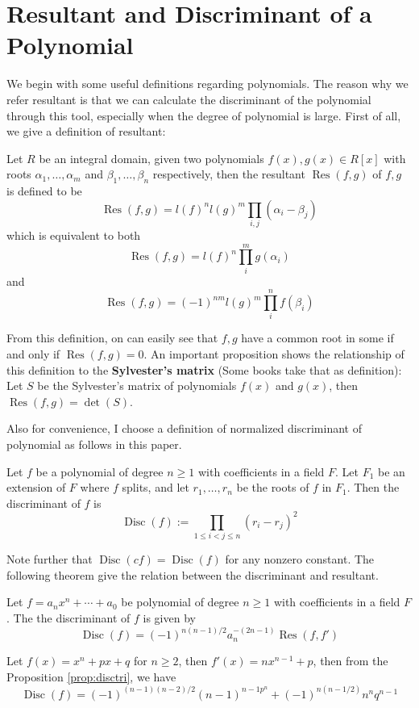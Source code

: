 \chapter{Resultant and Discriminant of a Polynomial}
\label{chap:appB}
We begin with some useful definitions regarding polynomials. The reason why we refer resultant is that we can calculate the discriminant of the polynomial through this tool, especially when the degree of polynomial is large. First of all, we give a definition of resultant\citep{healy2002resultants}:
\begin{definition}
Let $R$ be an integral domain, given two polynomials $f(x),g(x)\in R[x]$ with roots $\alpha_1,\dots,\alpha_m$ and $\beta_1,\dots,\beta_n$ respectively, then the resultant $\operatorname{Res}(f,g)$ of $f,g$ is defined to be $$\operatorname{Res}(f,g)=l(f)^nl(g)^m\prod_{i,j}(\alpha_i-\beta_j)$$ which is equivalent to both $$\operatorname{Res}(f,g)=l(f)^n\prod_{i}^m g(\alpha_i)$$ and $$\operatorname{Res}(f,g)=(-1)^{n m}l(g)^m\prod_{i}^n f(\beta_i)$$
\end{definition}
From this definition, on can easily see that $f,g$ have a common root in some if and only if $\operatorname{Res}(f,g)=0$.
An important proposition shows the relationship of this definition to the \textbf{Sylvester's matrix} (Some books take that as definition): Let $S$ be the Sylvester's matrix of polynomials $f(x)$ and $g(x)$, then $\operatorname{Res}(f,g)=\det(S)$.

Also for convenience, I choose a definition of normalized discriminant \citep{janson2007resultant} of polynomial as follows in this paper.

\begin{definition}
Let $f$ be a polynomial of degree $n\geq1$ with coefficients in a field $F$. Let $F_1$ be an extension of $F$ where $f$ splits, and let $r_1,\dots,r_n$ be the roots of $f$ in $F_1$. Then the discriminant of $f$ is $$\operatorname{Disc}(f):=\prod_{1\leq i<j\leq n}(r_i-r_j)^2$$
\end{definition}

Note further that $\operatorname{Disc}(cf)=\operatorname{Disc}(f)$ for any nonzero constant. The following theorem give the relation between the discriminant and resultant.

\begin{proposition}\label{prop:disctri}
Let $f=a_nx^n+\cdots+a_0$ be polynomial of degree $n\geq1$ with coefficients in a field $F$. The the discriminant of $f$ is given by 
$$\operatorname{Disc}(f)=(-1)^{n(n-1)/2}a^{-(2n-1)}_n \operatorname{Res}(f,f')$$
\end{proposition}

\begin{example}\label{for:nxpxq}
Let $f(x)=x^n+px+q$ for $n\geq2$, then $f'(x)=nx^{n-1}+p$, then from the Proposition \ref{prop:disctri}, we have $$\operatorname{Disc}(f)=(-1)^{(n-1)(n-2)/2}(n-1)^{n-1p^n}+(-1)^{n(n-1/2)}n^nq^{n-1}$$
\end{example}

